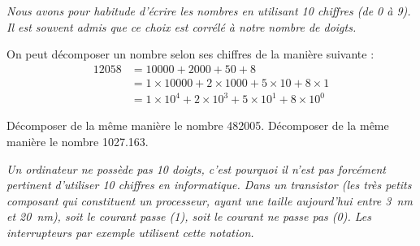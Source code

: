 \documentclass["../Cours.tex"]{subfiles}
\begin{document}
{ \color{noir}


\begin{questions}

    \textit{Nous avons pour habitude d'écrire les nombres en utilisant 10 chiffres (de 0 à 9). Il est souvent admis que ce choix est corrélé à notre nombre de doigts.}

    \question On peut décomposer un nombre selon ses chiffres de la manière suivante : 
    \begin{align*}
        \num{12058} &= \num{10000} + \num{2000} + 50 + 8 \\ 
        &= 1 \times \num{10000} + 2 \times \num{1000} + 5 \times 10 + 8 \times 1 \\ 
        &= 1 \times 10^4 + 2 \times 10^3 + 5 \times 10^1 + 8 \times 10^0
    \end{align*}

    \subquestion Décomposer de la même manière le nombre \num{482005}.
    \subquestion Décomposer de la même manière le nombre \num{1027.163}.


    \textit{Un ordinateur ne possède pas 10 doigts, c'est pourquoi il n'est pas forcément pertinent d'utiliser 10 chiffres en informatique. Dans un transistor (les très petits composant qui constituent un processeur, ayant une taille aujourd'hui entre \qty{3}{\nano\metre} et \qty{20}{\nano\metre}), soit le courant passe (1), soit le courant ne passe pas (0). Les interrupteurs par exemple utilisent cette notation. }


\end{questions}}
\end{document}
